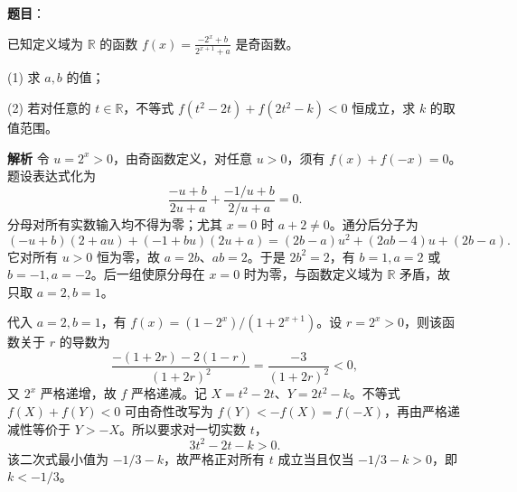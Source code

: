 \begin{answer}

\textbf{题目}：

已知定义域为 \(\mathbb R\) 的函数 \(f(x)=\frac{-2^x+b}{2^{x+1}+a}\) 是奇函数。

(1) 求 \(a,b\) 的值；

(2) 若对任意的 \(t\in\mathbb R\)，不等式 \(f(t^2-2t)+f(2t^2-k)<0\) 恒成立，求 \(k\) 的取值范围。

\textbf{解析}
令 \(u=2^x>0\)，由奇函数定义，对任意 \(u>0\)，须有 \(f(x)+f(-x)=0\)。题设表达式化为
\nopagebreak[4]
\[
\frac{-u+b}{2u+a}+\frac{-1/u+b}{2/u+a}=0.
\]
分母对所有实数输入均不得为零；尤其 \(x=0\) 时 \(a+2\ne0\)。通分后分子为
\nopagebreak[4]
\[
(-u+b)(2+au)+(-1+bu)(2u+a)
=(2b-a)u^2+(2ab-4)u+(2b-a).
\]
它对所有 \(u>0\) 恒为零，故 \(a=2b\)、\(ab=2\)。于是 \(2b^2=2\)，有 \(b=1,a=2\) 或 \(b=-1,a=-2\)。后一组使原分母在 \(x=0\) 时为零，与函数定义域为 \(\mathbb R\) 矛盾，故只取 \(a=2,b=1\)。

代入 \(a=2,b=1\)，有 \(f(x)=(1-2^x)/(1+2^{x+1})\)。设 \(r=2^x>0\)，则该函数关于 \(r\) 的导数为
\nopagebreak[4]
\[
\frac{-(1+2r)-2(1-r)}{(1+2r)^2}=\frac{-3}{(1+2r)^2}<0,
\]
又 \(2^x\) 严格递增，故 \(f\) 严格递减。记 \(X=t^2-2t\)、\(Y=2t^2-k\)。不等式 \(f(X)+f(Y)<0\) 可由奇性改写为 \(f(Y)<-f(X)=f(-X)\)，再由严格递减性等价于 \(Y>-X\)。所以要求对一切实数 \(t\)，
\nopagebreak[4]
\[
3t^2-2t-k>0.
\]
该二次式最小值为 \(-1/3-k\)，故严格正对所有 \(t\) 成立当且仅当 \(-1/3-k>0\)，即 \(k<-1/3\)。



\end{answer}
